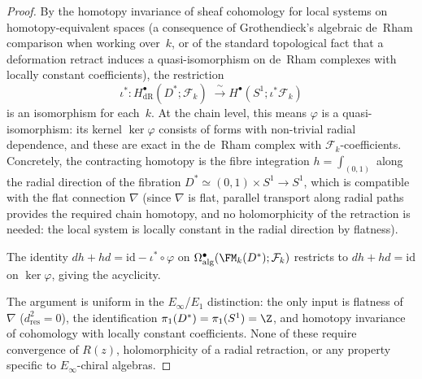 \begin{proof}
By the homotopy invariance of sheaf cohomology for local
systems on homotopy-equivalent spaces (a consequence of
Grothendieck's algebraic de~Rham comparison when working
over~$k$, or of the standard topological fact that a
deformation retract induces a quasi-isomorphism on
de~Rham complexes with locally constant coefficients),
the restriction
\[
\iota^*\colon
H^\bullet_{\mathrm{dR}}(D^*;\mathcal{F}_k)
\;\xrightarrow{\;\sim\;}
H^\bullet(S^1;\iota^*\mathcal{F}_k)
\]
is an isomorphism for each~$k$. At the chain level, this
means $\varphi$ is a quasi-isomorphism: its kernel
$\ker\varphi$ consists of forms with non-trivial radial
dependence, and these are exact in the de~Rham complex
with $\mathcal{F}_k$-coefficients. Concretely, the
contracting homotopy is the fibre integration
$h=\int_{(0,1)}$ along the radial direction of the
fibration $D^*\simeq(0,1)\times S^1\to S^1$, which is
compatible with the flat connection $\nabla$ (since
$\nabla$ is flat, parallel transport along radial paths
provides the required chain homotopy, and no holomorphicity
of the retraction is needed: the local system is locally
constant in the radial direction by flatness).

The identity $dh+hd=\mathrm{id}-\iota^*\circ\varphi$ on
$\Omega^\bullet_{\mathrm{alg}}(\FM_k(D^*);\mathcal{F}_k)$
restricts to $dh+hd=\mathrm{id}$ on $\ker\varphi$,
giving the acyclicity.

The argument is uniform in the $E_\infty$/$E_1$ distinction:
the only input is flatness of $\nabla$
($d_{\mathrm{res}}^2=0$), the identification
$\pi_1(D^*)=\pi_1(S^1)=\Z$, and homotopy invariance
of cohomology with locally constant coefficients. None of
these require convergence of $R(z)$, holomorphicity of a
radial retraction, or any property specific to
$E_\infty$-chiral algebras.
\end{proof}


